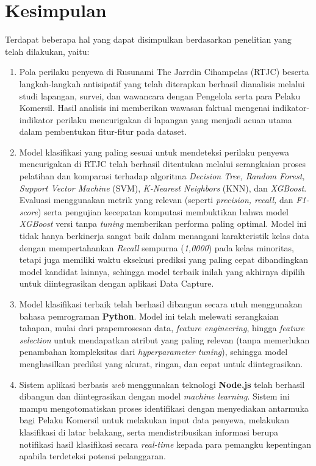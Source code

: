 \section{Kesimpulan}
\label{sec:kesimpulan}
Terdapat beberapa hal yang dapat disimpulkan berdasarkan penelitian yang telah dilakukan, yaitu:

\begin{enumerate}
    \item Pola perilaku penyewa di Rusunami The Jarrdin Cihampelas (RTJC) beserta langkah-langkah antisipatif yang telah diterapkan berhasil dianalisis melalui studi lapangan, survei, dan wawancara dengan Pengelola serta para Pelaku Komersil. Hasil analisis ini memberikan wawasan faktual mengenai indikator-indikator perilaku mencurigakan di lapangan yang menjadi acuan utama dalam pembentukan fitur-fitur pada dataset.
    
    \item Model klasifikasi yang paling sesuai untuk mendeteksi perilaku penyewa mencurigakan di RTJC telah berhasil ditentukan melalui serangkaian proses pelatihan dan komparasi terhadap algoritma \textit{Decision Tree, Random Forest, Support Vector Machine} (SVM), \textit{K-Nearest Neighbors} (KNN), dan \textit{XGBoost}. Evaluasi menggunakan metrik yang relevan (seperti \textit{precision, recall,} dan \textit{F1-score}) serta pengujian kecepatan komputasi membuktikan bahwa model \textit{XGBoost} versi tanpa \textit{tuning} memberikan performa paling optimal. Model ini tidak hanya berkinerja sangat baik dalam menangani karakteristik kelas data dengan mempertahankan \textit{Recall} sempurna (\textit{1,0000}) pada kelas minoritas, tetapi juga memiliki waktu eksekusi prediksi yang paling cepat dibandingkan model kandidat lainnya, sehingga model terbaik inilah yang akhirnya dipilih untuk diintegrasikan dengan aplikasi Data Capture.
    
    \item Model klasifikasi terbaik telah berhasil dibangun secara utuh menggunakan bahasa pemrograman \textbf{Python}. Model ini telah melewati serangkaian tahapan, mulai dari prapemrosesan data, \textit{feature engineering}, hingga \textit{feature selection} untuk mendapatkan atribut yang paling relevan (tanpa memerlukan penambahan kompleksitas dari \textit{hyperparameter tuning}), sehingga model menghasilkan prediksi yang akurat, ringan, dan cepat untuk diintegrasikan.
    
    \item Sistem aplikasi berbasis \textit{web} menggunakan teknologi \textbf{Node.js} telah berhasil dibangun dan diintegrasikan dengan model \textit{machine learning}. Sistem ini mampu mengotomatiskan proses identifikasi dengan menyediakan antarmuka bagi Pelaku Komersil untuk melakukan input data penyewa, melakukan klasifikasi di latar belakang, serta mendistribusikan informasi berupa notifikasi hasil klasifikasi secara \textit{real-time} kepada para pemangku kepentingan apabila terdeteksi potensi pelanggaran.
\end{enumerate}
